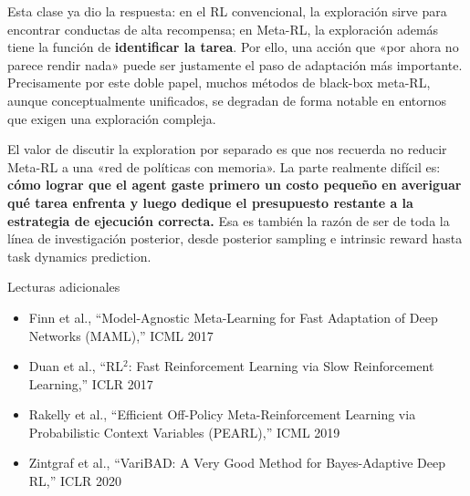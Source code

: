 Esta clase ya dio la respuesta: en el RL convencional, la exploración sirve para encontrar conductas de alta recompensa; en Meta-RL, la exploración además tiene la función de \textbf{identificar la tarea}. Por ello, una acción que «por ahora no parece rendir nada» puede ser justamente el paso de adaptación más importante. Precisamente por este doble papel, muchos métodos de black-box meta-RL, aunque conceptualmente unificados, se degradan de forma notable en entornos que exigen una exploración compleja.

El valor de discutir la exploration por separado es que nos recuerda no reducir Meta-RL a una «red de políticas con memoria». La parte realmente difícil es: \textbf{cómo lograr que el agent gaste primero un costo pequeño en averiguar qué tarea enfrenta y luego dedique el presupuesto restante a la estrategia de ejecución correcta.} Esa es también la razón de ser de toda la línea de investigación posterior, desde posterior sampling e intrinsic reward hasta task dynamics prediction.

\begin{knowledgebox}{Lecturas adicionales}
\begin{itemize}
    \item Finn et al., ``Model-Agnostic Meta-Learning for Fast Adaptation of Deep Networks (MAML),'' ICML 2017
    \item Duan et al., ``RL$^2$: Fast Reinforcement Learning via Slow Reinforcement Learning,'' ICLR 2017
    \item Rakelly et al., ``Efficient Off-Policy Meta-Reinforcement Learning via Probabilistic Context Variables (PEARL),'' ICML 2019
    \item Zintgraf et al., ``VariBAD: A Very Good Method for Bayes-Adaptive Deep RL,'' ICLR 2020
\end{itemize}
\end{knowledgebox}


